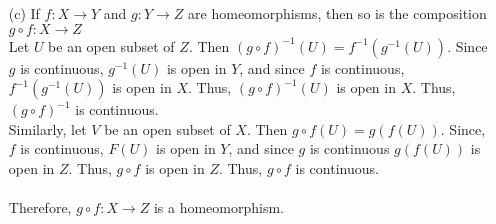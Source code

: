 \documentclass[12pt]{article}
\begin{document}
\begin{enumerate}
\begin{enumerate}
		\item[(c)] If $f : X \rightarrow Y$ and $g : Y \rightarrow Z$ are homeomorphisms, then so is the composition $g \circ f : X \rightarrow Z$\\
		Let $ U $ be an open subset of $ Z $. Then $ (g \circ f)^{-1}(U)=f^{-1}(g^{-1}(U)) $. Since $ g $ is continuous, $ g^{-1}(U) $ is open in $ Y $, and since $ f $ is continuous, $ f^{-1}(g^{-1}(U)) $ is open in $ X $. Thus, $ (g \circ f)^{-1}(U) $ is open in $ X $. Thus, $ (g \circ f)^{-1} $ is continuous.\\
		Similarly, let $ V $ be an open subset of $ X $. Then $ g \circ f (U) = g(f(U))$. Since, $ f $ is continuous, $ F(U) $ is open in $ Y $, and since $ g $ is continuous $ g(f(U)) $ is open in $ Z $. Thus, $ g \circ f $ is open in $ Z $. Thus, $ g \circ f $ is continuous.\\
		\\
		Therefore, $g \circ f : X \rightarrow Z$ is a homeomorphism.
		
	\end{enumerate}
	

\end{enumerate}
\end{document}
